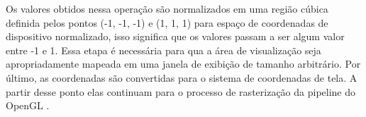 Os valores obtidos nessa operação são normalizados em uma região cúbica definida pelos pontos (-1, -1, -1) e (1, 1, 1) para espaço de coordenadas de dispositivo normalizado, isso significa que os valores passam a ser algum valor entre -1 e 1. Essa etapa é necessária para qua a área de visualização seja apropriadamente mapeada em uma janela de exibição de tamanho arbitrário. Por último, as coordenadas são convertidas para o sistema de coordenadas de tela. A partir desse ponto elas continuam para o processo de rasterização da pipeline do OpenGL \cite{openglOnline}. 
	\begin{figure}[hbp]
		\centering
        \begin{subfigure}{0.46\textwidth}
        \end{subfigure}
		\hfill
        \begin{subfigure}{0.48\textwidth}
        \end{subfigure}
		{
		}
	\end{figure}

